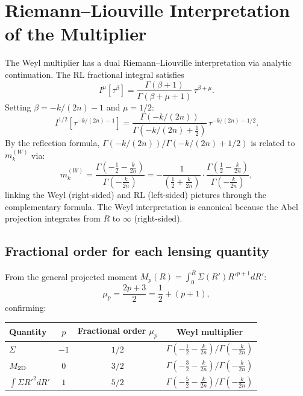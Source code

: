 \documentclass{article}
\begin{document}
\section{Riemann--Liouville Interpretation of the Multiplier}
\label{sec:RL}

The Weyl multiplier has a dual Riemann--Liouville interpretation via analytic
continuation. The RL fractional integral satisfies
\begin{equation}
I^{\mu}[\tau^\beta]
= \frac{\Gamma(\beta+1)}{\Gamma(\beta+\mu+1)}\,\tau^{\beta+\mu}.
\end{equation}
Setting $\beta = -k/(2n)-1$ and $\mu=1/2$:
\begin{equation}
I^{1/2}[\tau^{-k/(2n)-1}]
= \frac{\Gamma(-k/(2n))}{\Gamma(-k/(2n)+\frac12)}\,\tau^{-k/(2n)-1/2}.
\end{equation}
By the reflection formula,
$\Gamma(-k/(2n))/\Gamma(-k/(2n)+1/2)$ is related to $m_k^{(W)}$ via:
\begin{equation}
m_k^{(W)} = \frac{\Gamma(-\frac12-\frac{k}{2n})}{\Gamma(-\frac{k}{2n})}
= -\frac{1}{(\frac12+\frac{k}{2n})}
\cdot\frac{\Gamma(\frac12-\frac{k}{2n})}{\Gamma(-\frac{k}{2n})},
\end{equation}
linking the Weyl (right-sided) and RL (left-sided) pictures through the
complementary formula. The Weyl interpretation is canonical because the Abel
projection integrates from $R$ to $\infty$ (right-sided).

\subsection{Fractional order for each lensing quantity}

From the general projected moment
$M_p(R) = \int_0^R\Sigma(R')R'^{p+1}dR'$:
\begin{equation}
\mu_p = \frac{2p+3}{2} = \frac12 + (p+1),
\end{equation}
confirming:
\begin{center}
\begin{tabular}{lccc}
\toprule
Quantity & $p$ & Fractional order $\mu_p$ & Weyl multiplier\\
\midrule
$\Sigma$ & $-1$ & $1/2$ &
  $\Gamma(-\frac12-\frac{k}{2n})/\Gamma(-\frac{k}{2n})$\\
$M_{\rm 2D}$ & $0$ & $3/2$ &
  $\Gamma(-\frac32-\frac{k}{2n})/\Gamma(-\frac{k}{2n})$\\
$\int\Sigma R'^2 dR'$ & $1$ & $5/2$ &
  $\Gamma(-\frac52-\frac{k}{2n})/\Gamma(-\frac{k}{2n})$\\
\bottomrule
\end{tabular}
\end{center}
\end{document}
